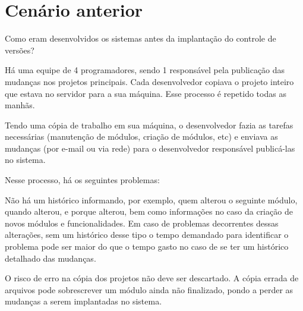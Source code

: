 \section{Cenário anterior}

Como eram desenvolvidos os sistemas antes da implantação do controle de versões?

Há uma equipe de 4 programadores, sendo 1 responsável pela publicação das mudanças nos projetos principais. Cada desenvolvedor copiava o projeto inteiro que estava no servidor para a sua máquina. Esse processo é repetido todas as manhãs.

Tendo uma cópia de trabalho em sua máquina, o desenvolvedor fazia as tarefas necessárias (manutenção de módulos, criação de módulos, etc) e enviava as mudanças (por e-mail ou via rede) para o desenvolvedor responsável publicá-las no sistema.

Nesse processo, há os seguintes problemas:

Não há um histórico informando, por exemplo, quem alterou o seguinte módulo, quando alterou, e porque alterou, bem como informações no caso da criação de novos módulos e funcionalidades. Em caso de problemas decorrentes dessas alterações, sem um histórico desse tipo o tempo demandado para identificar o problema pode ser maior do que o tempo gasto no caso de se ter um histórico detalhado das mudanças.

O risco de erro na cópia dos projetos não deve ser descartado. A cópia errada de arquivos pode sobrescrever um módulo ainda não finalizado, pondo a perder as mudanças a serem implantadas no sistema.

